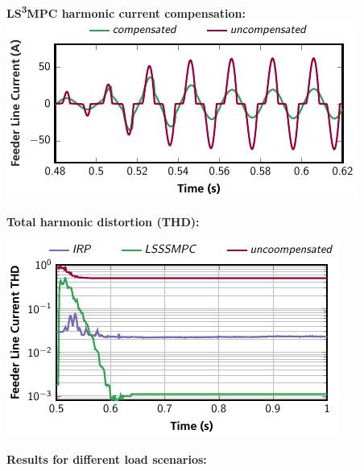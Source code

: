 \documentclass[a0paper,portrait]{baposter}
\begin{document}
\begin{poster}
{\textbf{LS\textsuperscript{3}MPC harmonic current compensation:}
\includegraphics{mpcif_const}

\vspace{-.4em}
\begin{flushleft}
\textbf{Total harmonic distortion (THD):}
\end{flushleft}
\vspace{-.6em}
\includegraphics{thd_2nd} \\

\vspace{-1.7em}
\begin{flushleft}
\textbf{Results for different load scenarios:} \end{flushleft}

}
\end{poster}
\end{document}
